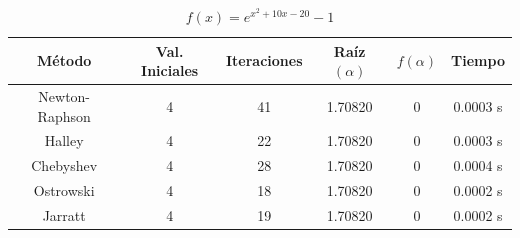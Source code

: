 \begin{table}[H]
\centering

\renewcommand{\arraystretch}{1.3} %
\setlength{\tabcolsep}{12pt}      %

\begin{tabular}{cccccc}
\hline
Método & Val. Iniciales & Iteraciones & Raíz $(\alpha)$ & $f(\alpha)$ & Tiempo \\
\hline

Newton-Raphson & 4 & 41 & 1.70820 & 0                    & 0.0003 s \\

Halley         & 4 & 22 & 1.70820 & 0                    & 0.0003 s \\

Chebyshev      & 4 & 28 & 1.70820 & 0                    & 0.0004 s \\

Ostrowski      & 4 & 18 & 1.70820 & 0                    & 0.0002 s \\

Jarratt        & 4 & 19 & 1.70820 & 0                    & 0.0002 s \\

\hline
\end{tabular}

\caption{$f(x) = e^{x^{2} + 10 x - 20} - 1$}
\end{table}


